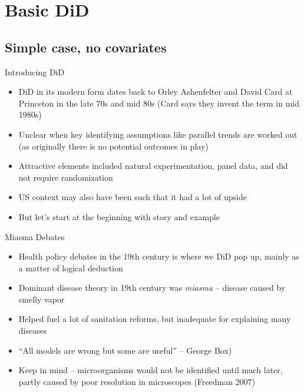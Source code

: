 \documentclass{beamer}
\begin{document}




\section{Basic DiD}

\subsection{Simple case, no covariates}

\begin{frame}{Introducing DiD}

\begin{itemize}
\item DiD in its modern form dates back to Orley Ashenfelter and David Card at Princeton in the late 70s and mid 80s (Card says they invent the term in mid 1980s)
\item Unclear when key identifying assumptions like parallel trends are worked out (as originally there is no potential outcomes in play)
\item Attractive elements included natural experimentation, panel data, and did not require randomization
\item US context may also have been such that it had a lot of upside
\item But let's start at the beginning with story and example
\end{itemize}

\end{frame}

\begin{frame}{Miasma Debates}

\begin{itemize}

\item Health policy debates in the 19th century is where we DiD pop up, mainly as a matter of logical deduction 
\item Dominant disease theory in 19th century was \emph{miasma} -- disease caused by smelly vapor
\item Helped fuel a lot of sanitation reforms, but inadequate for explaining many diseases 
\item ``All models are wrong but some are useful'' -- George Box)
\item Keep in mind -- microorganisms would not be identified until much later, partly caused by poor resolution in microscopes (Freedman 2007)

\end{itemize}

\end{frame}
\end{document}
